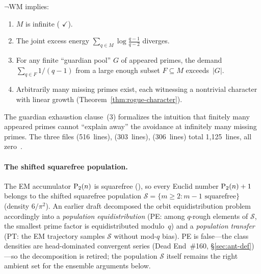 \begin{theorem}
\label{thm:spectral-conspiracy}
$\neg\mathrm{WM}$ implies:
\begin{enumerate}[nosep]
\item $M$ is infinite
  (
  {\color{leanink}$\checkmark$}).
\item The joint excess energy $\sum_{q \in M} \log\frac{q-1}{q-2}$ diverges.
\item For any finite ``guardian pool'' $G$ of appeared primes, the
  demand $\sum_{q \in F} 1/(q{-}1)$ from a large enough subset
  $F \subseteq M$ exceeds~$|G|$.
\item Arbitrarily many missing primes exist, each witnessing a nontrivial
  character with linear growth (Theorem~\textup{\ref{thm:rogue-character}}).
\end{enumerate}
\end{theorem}

\noindent
The guardian exhaustion clause~(3) formalizes the intuition that finitely
many appeared primes cannot ``explain away'' the avoidance at infinitely
many missing primes.  The three files
 (516~lines),
 (303~lines),
 (306~lines)
total 1{,}125~lines, all zero~.

\paragraph{The shifted squarefree population.}
The EM accumulator $\mathrm{P}_{2}(n)$ is squarefree
(),
so every Euclid number $\mathrm{P}_{2}(n)+1$ belongs to the shifted
squarefree population
$\mathcal{S} = \{m \geq 2 : m{-}1 \text{ squarefree}\}$
(density $6/\pi^2$).  An earlier draft decomposed the orbit
equidistribution problem accordingly into a \emph{population
equidistribution} (PE: among $q$-rough elements of $\mathcal{S}$, the
smallest prime factor is equidistributed modulo~$q$) and a
\emph{population transfer} (PT: the EM trajectory samples
$\mathcal{S}$ without mod-$q$ bias).  PE is false---the class
densities are head-dominated convergent series (Dead End~\#160,
\S\ref{sec:ant-def})---so the decomposition is retired; the
population $\mathcal{S}$ itself remains the right ambient set for the
ensemble arguments below.

